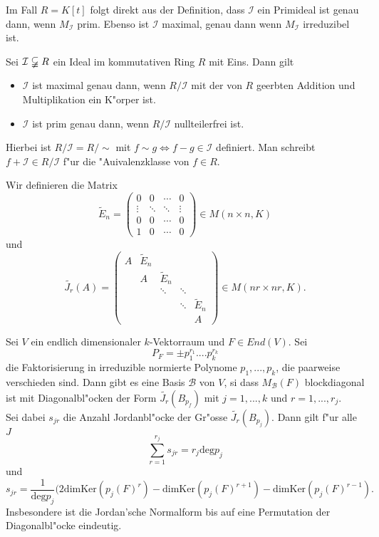 \documentclass[8pt, a4paper, twocolumn, landscape]{article}
\begin{document}
{ \begin{remark}
 Im Fall $R = K[t]$ folgt direkt aus der Definition, dass $\mathcal{I}$ ein Primideal ist genau dann, wenn $M_\mathcal{I}$ prim. Ebenso ist $\mathcal{I}$ maximal, genau dann wenn $M_\mathcal{I}$ irreduzibel ist.
 \end{remark}
 
 \begin{lemma}
 Sei $\mathcal{I} \varsubsetneqq R$ ein Ideal im kommutativen Ring $R$ mit Eins. Dann gilt \begin{itemize}
 \item $\mathcal{I}$ ist maximal genau dann, wenn $R / \mathcal{I}$ mit der von $R$ geerbten Addition und Multiplikation ein K"orper ist.
 \item $\mathcal{I}$ ist prim genau dann, wenn $R/ \mathcal{I}$ nullteilerfrei ist.
 \end{itemize}
 Hierbei ist $R / \mathcal{I} = R / \sim$ mit $f \sim g \Leftrightarrow f - g \in \mathcal{I}$ definiert. Man schreibt $f + \mathcal{I} \in R / \mathcal{I}$ f"ur die "Auivalenzklasse von $f \in R$. 
 \end{lemma}
 
 

 \begin{definition}
 Wir definieren die Matrix
 $$
 \tilde{E}_n =
\left(\begin{array}{cccc}0 & 0 & \cdots & 0 \\ \vdots & \ddots & \ddots & \vdots \\ 0 & 0 & \cdots & 0 \\ 1 & 0 & \cdots & 0\end{array}\right) \in M(n \times n, K)
 $$
 und 
 $$
 \tilde{J_r}(A)
=\left(\begin{array}{ccccc}A & \tilde{E}_{n} & & & \\ & A & \tilde{E}_{n} & & \\ & & \ddots & \ddots & \\ & & & \ddots & \tilde{E}_{n} \\ & & & & A\end{array}\right) \in M(n r \times n r, K).
 $$
 \end{definition}
 
 
 \begin{theorem}
 Sei $V$ ein endlich dimensionaler $k$-Vektorraum und $F \in End(V)$. Sei
 $$
 P_F = \pm p_1^{r_1} .... p_k^{r_k}
 $$
 die Faktorisierung in irreduzible normierte Polynome $p_1, ..., p_k$, die paarweise verschieden sind. Dann gibt es eine Basis $\mathcal{B}$ von $V$, si dass $M_\mathcal{B}(F)$ blockdiagonal ist mit Diagonalbl"ocken der Form $\tilde{J_r}(B_{p_f})$ mit $j = 1, ..., k$ und $r = 1, ..., r_j$.
 \\ Sei dabei $s_{jr}$ die Anzahl Jordanbl"ocke der Gr"osse $\tilde{J_r}(B_{p_j})$. 
 Dann gilt f"ur alle $J$
 $$
 \sum\limits_{r = 1}^{r_j} s_{jr} = r_j \mathrm{deg} p_j
 $$
 und 
 $$
 s_{jr} = \frac{1}{\mathrm{deg}  p_j}(2 \mathrm{dim} \mathrm{Ker} (p_j(F)^r) -\mathrm{dim} \mathrm{Ker}(p_j(F)^{r+1}) - \mathrm{dim} \mathrm{Ker}(p_j(F)^{r-1}).
 $$
 Insbesondere ist die Jordan'sche Normalform bis auf eine Permutation der Diagonalbl"ocke eindeutig.
  

\end{theorem}}
\end{document}
